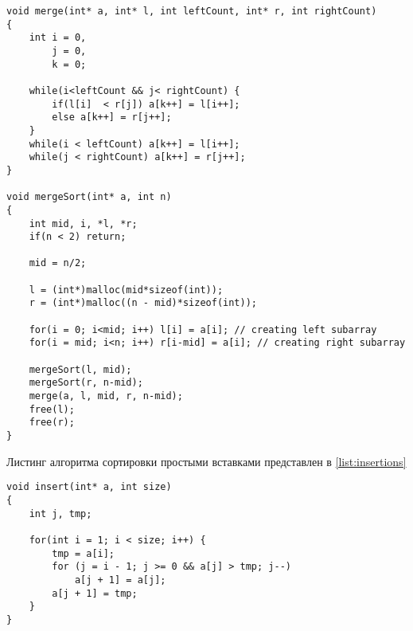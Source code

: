 \begin{lstlisting}[style=CStyle, caption={merge sort},
                    label={list:merge}]
void merge(int* a, int* l, int leftCount, int* r, int rightCount)
{
    int i = 0, 
        j = 0, 
        k = 0;

    while(i<leftCount && j< rightCount) {
        if(l[i]  < r[j]) a[k++] = l[i++];
        else a[k++] = r[j++];
    }
    while(i < leftCount) a[k++] = l[i++];
    while(j < rightCount) a[k++] = r[j++];
}

void mergeSort(int* a, int n)
{
    int mid, i, *l, *r;
    if(n < 2) return;

    mid = n/2;

    l = (int*)malloc(mid*sizeof(int)); 
    r = (int*)malloc((n - mid)*sizeof(int)); 
	
    for(i = 0; i<mid; i++) l[i] = a[i]; // creating left subarray
    for(i = mid; i<n; i++) r[i-mid] = a[i]; // creating right subarray

    mergeSort(l, mid);
    mergeSort(r, n-mid);
    merge(a, l, mid, r, n-mid);
    free(l);
    free(r);
}
\end{lstlisting}

Листинг алгоритма сортировки простыми вставками представлен в \ref{list:insertions}

\begin{lstlisting}[style=CStyle, caption={Insertions sort},
                    label={list:insertions}]
void insert(int* a, int size)
{
    int j, tmp;
    
    for(int i = 1; i < size; i++) {
        tmp = a[i];
        for (j = i - 1; j >= 0 && a[j] > tmp; j--)
            a[j + 1] = a[j];
        a[j + 1] = tmp;
    }
}
\end{lstlisting}



